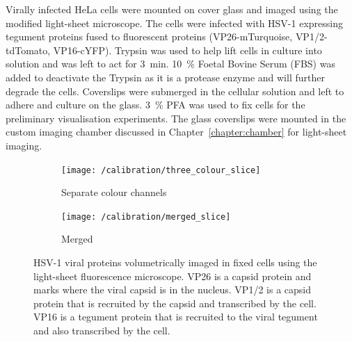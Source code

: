 Virally infected HeLa cells were mounted on cover glass and imaged using the modified light-sheet microscope.
The cells were infected with HSV-1 expressing tegument proteins fused to fluorescent proteins (\gls{VP26}-mTurquoise, \gls{VP1/2}-tdTomato, \gls{VP16}-cYFP).
Trypsin was used to help lift cells in culture into solution and was left to act for \SI{3}{\minute}.
\SI{10}{\percent} Foetal Bovine Serum (FBS) was added to deactivate the Trypsin as it is a protease enzyme and will further degrade the cells.
Coverslips were submerged in the cellular solution and left to adhere and culture on the glass.
\SI{3}{\percent} \gls{PFA} was used to fix cells for the preliminary visualisation experiments.
The glass coverslips were mounted in the custom imaging chamber discussed in Chapter~\ref{chapter:chamber} for light-sheet imaging.


\begin{figure}
	\centering
	\begin{subfigure}[b]{0.7\linewidth}
    \centering
    \texttt{[image: /calibration/three\_colour\_slice]}
    \caption{Separate colour channels}\label{fig:merged_slice}
	\end{subfigure}
	\begin{subfigure}[b]{0.25\linewidth}
    \centering
    \texttt{[image: /calibration/merged\_slice]}
    \caption{Merged}\label{fig:three_colour_slice}
	\end{subfigure}
	\caption[\gls{HSV}-1 viral proteins volumetrically imaged in fixed cells using the light-sheet fluorescence microscope]{
    \gls{HSV}-1 viral proteins volumetrically imaged in fixed cells using the light-sheet fluorescence microscope.
    \gls{VP26} is a capsid protein and marks where the viral capsid is in the nucleus.
    \gls{VP1/2} is a capsid protein that is recruited by the capsid and transcribed by the cell.
    \gls{VP16} is a tegument protein that is recruited to the viral tegument and also transcribed by the cell.
    }\label{fig:virus_image}
\end{figure}

